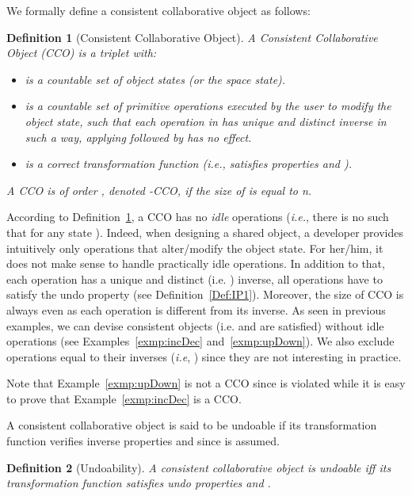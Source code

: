 \documentclass[submission,copyright,creativecommons]{eptcs}
\newtheorem{definition}{Definition}
\begin{document}
We formally define  a consistent collaborative object as follows:
\begin{definition}[Consistent Collaborative Object]\label{def:cco}
A \emph{Consistent Collaborative Object}  (CCO) is a triplet  with:
\begin{itemize}[]
\item  is a countable set of object \emph{states} (or the space state).\vspace{-.15cm}
\item  is a countable set of \emph{primitive operations} executed by the user to \emph{modify} the object state, such that
each operation  in  has \emph{unique} and \emph{distinct  inverse} 
in such a way, applying  followed by  has no effect.\vspace{-.15cm}
\item  is a \emph{correct} transformation function (\textit{i.e.},
 satisfies properties  and ). 
\end{itemize}
 A CCO is of order , denoted -CCO, if the size of  is equal to n.
\end{definition}

 
According to Definition~\ref{def:cco},  a CCO has no \emph{idle} operations (\textit{i.e.}, there is no  such that  for
any state ). Indeed,  when designing a shared object, a developer provides intuitively only operations that alter/modify the
object state. For her/him, it does not make sense to handle practically idle operations.  In addition to that, each operation has a unique and distinct (i.e. )
inverse, all operations have to satisfy the undo property  (see Definition~\ref{Def:IP1}).
Moreover,  the size of CCO is always even as each operation is different from its inverse. 
As seen in  previous examples, we can devise consistent objects (i.e.  and  are satisfied) 
without idle operations (see Examples~\ref{exmp:incDec} and~\ref{exmp:upDown}). 
We also exclude operations equal to their inverses (\emph{i.e}, ) since they are not interesting in practice.

Note that Example~\ref{exmp:upDown} is not a CCO since  is violated while it is easy to prove that Example~\ref{exmp:incDec} is a CCO. 
 
A consistent collaborative object is said to be undoable if its transformation function verifies inverse properties  and  since  is assumed.

 \begin{definition}[Undoability]\label{def:undo}
A consistent collaborative object  is \emph{undoable} iff its transformation
function  satisfies undo properties  and .
\end{definition}
 
\end{document}
